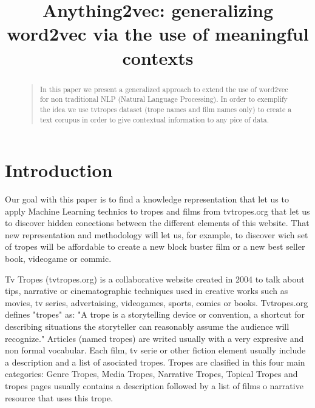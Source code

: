 \documentclass[letterpaper]{article}
\title{Anything2vec: generalizing word2vec via the use of meaningful contexts}
\begin{document}
 
\maketitle
\begin{abstract}
\begin{quote}
In this paper we present a generalized approach to extend the use of word2vec for non traditional NLP (Natural Language Processing). In order to exemplify the idea we use tvtropes dataset (trope names and film names only) to create a text corupus in order to give contextual information to any pice of data.
\end{quote}
\end{abstract}

\section{Introduction}


Our goal with this paper is to find a knowledge representation that let us to apply Machine Learning technics to tropes and films from tvtropes.org that let us to discover hidden conections between the different elements of this website. That new representation and methodology will let us, for example, to discover wich set of tropes will be affordable to create a new block buster film or a new best seller book, videogame or commic.   

Tv Tropes (tvtropes.org) is a collaborative website created in 2004 to talk about tips, narrative or cinematographic techniques used in creative works such as movies, tv series, advertaising, videogames, sports, comics or books. Tvtropes.org defines "tropes" as: "A trope is a storytelling device or convention, a shortcut for describing situations the storyteller can reasonably assume the audience will recognize." Articles (named tropes) are writed usually with a very expresive and non formal vocabular. Each film, tv serie or other fiction element usually include a description and a list of asociated tropes. Tropes are clasified in this four main categories: Genre Tropes, Media Tropes, Narrative Tropes, Topical Tropes and tropes pages usually contains a description followed by a list of films o narrative resource that uses this trope.   


\end{document}
